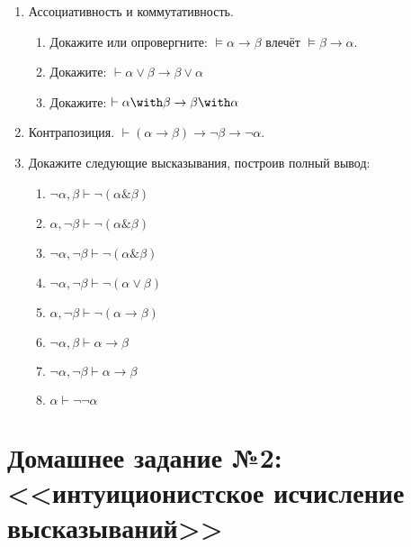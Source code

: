 \documentclass[10pt,a4paper,oneside]{article}
\begin{document}
\begin{enumerate}
\item Ассоциативность и коммутативность.
\begin{enumerate}
\item Докажите или опровергните: $\models \alpha\rightarrow\beta$ влечёт $\models \beta\rightarrow\alpha$.
\item Докажите: $\vdash \alpha\vee\beta \rightarrow \beta\vee\alpha$
\item Докажите: $\vdash \alpha\with\beta \rightarrow \beta\with\alpha$
\end{enumerate}

\item Контрапозиция. $\vdash (\alpha\rightarrow\beta) \rightarrow \neg\beta\rightarrow\neg\alpha$.

\item Докажите следующие высказывания, построив полный вывод:
\begin{enumerate}
\item $\neg\alpha,\beta \vdash \neg(\alpha\&\beta)$
\item $\alpha,\neg\beta \vdash \neg(\alpha\&\beta)$
\item $\neg\alpha,\neg\beta \vdash \neg(\alpha\&\beta)$
\item $\neg\alpha,\neg\beta \vdash \neg(\alpha\vee\beta)$
\item $\alpha,\neg\beta \vdash \neg(\alpha\rightarrow\beta)$
\item $\neg\alpha,\beta \vdash \alpha\rightarrow\beta$
\item $\neg\alpha,\neg\beta \vdash \alpha\rightarrow\beta$
\item $\alpha \vdash \neg\neg\alpha$
\end{enumerate}

\end{enumerate}

\section*{Домашнее задание №2: <<интуиционистское исчисление высказываний>>}
\end{document}

